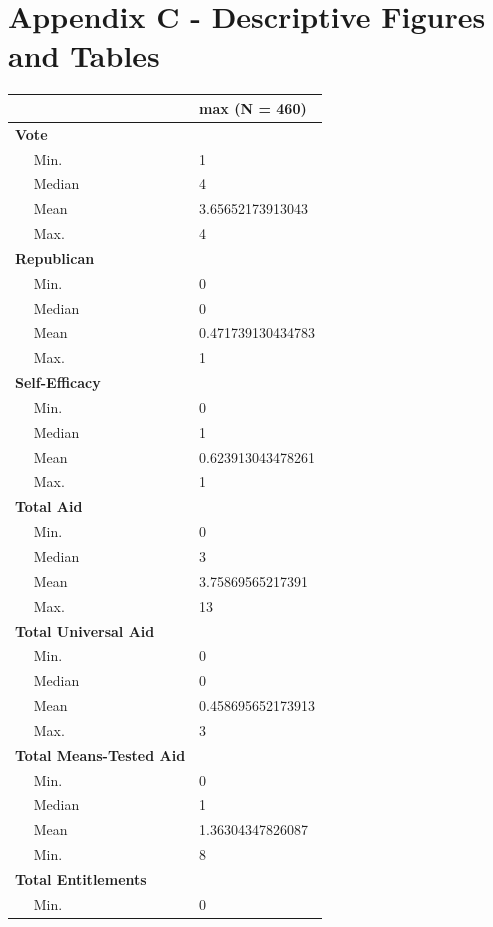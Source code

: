 \documentclass[12pt]{paper}
\begin{document}
\section*{Appendix C - Descriptive Figures and Tables}

\begin{table}
\begin{tabular}{l|l}
	\hline
	& max (N = 460)\\
	\hline
	\bf{Vote} & ~\\
	\hline
	~~ Min. & 1\\
	\hline
	~~ Median & 4\\
	\hline
	~~ Mean & 3.65652173913043\\
	\hline
	~~ Max. & 4\\
	\hline
	\bf{Republican} & ~\\
	\hline
	~~ Min. & 0\\
	\hline
	~~ Median & 0\\
	\hline
	~~ Mean & 0.471739130434783\\
	\hline
	~~ Max. & 1\\
	\hline
	\bf{Self-Efficacy} & ~\\
	\hline
	~~ Min. & 0\\
	\hline
	~~ Median & 1\\
	\hline
	~~ Mean & 0.623913043478261\\
	\hline
	~~ Max. & 1\\
	\hline
	\bf{Total Aid} & ~\\
	\hline
	~~ Min. & 0\\
	\hline
	~~ Median & 3\\
	\hline
	~~ Mean & 3.75869565217391\\
	\hline
	~~ Max. & 13\\
	\hline
	\bf{Total Universal Aid} & ~\\
	\hline
	~~ Min. & 0\\
	\hline
	~~ Median & 0\\
	\hline
	~~ Mean & 0.458695652173913\\
	\hline
	~~ Max. & 3\\
	\hline
	\bf{Total Means-Tested Aid} & ~\\
	\hline
	~~ Min. & 0\\
	\hline
	~~ Median & 1\\
	\hline
	~~ Mean & 1.36304347826087\\
	\hline
	~~ Min. & 8\\
	\hline
	\bf{Total Entitlements} & ~\\
	\hline
	~~ Min. & 0\\

\end{tabular}
\end{table}
\end{document}
